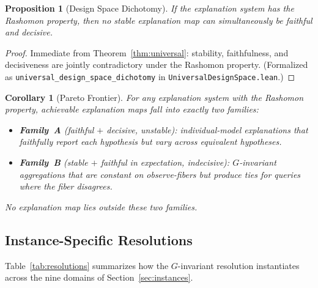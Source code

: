 \documentclass{article}
\newtheorem{corollary}{Corollary}
\newtheorem{proposition}{Proposition}
\begin{document}
\begin{proposition}[Design Space Dichotomy]
\label{prop:dichotomy}
If the explanation system has the Rashomon property, then no stable
explanation map can simultaneously be faithful and decisive.
\end{proposition}

\begin{proof}
Immediate from Theorem~\ref{thm:universal}: stability, faithfulness, and
decisiveness are jointly contradictory under the Rashomon property.
(Formalized as \texttt{universal\_design\_space\_dichotomy} in
\texttt{UniversalDesignSpace.lean}.)
\end{proof}

\begin{corollary}[Pareto Frontier]
\label{cor:pareto}
For any explanation system with the Rashomon property, achievable
explanation maps fall into exactly two families:
\begin{itemize}
  \item \textbf{Family~A} (faithful $+$ decisive, unstable): individual-model
    explanations that faithfully report each hypothesis but vary across
    equivalent hypotheses.
  \item \textbf{Family~B} (stable $+$ faithful in expectation, indecisive):
    $G$-invariant aggregations that are constant on observe-fibers but
    produce ties for queries where the fiber disagrees.
\end{itemize}
No explanation map lies outside these two families.
\end{corollary}

\subsection{Instance-Specific Resolutions}
\label{sec:resolution-instances}

Table~\ref{tab:resolutions} summarizes how the $G$-invariant resolution
instantiates across the nine domains of Section~\ref{sec:instances}.
\end{document}

